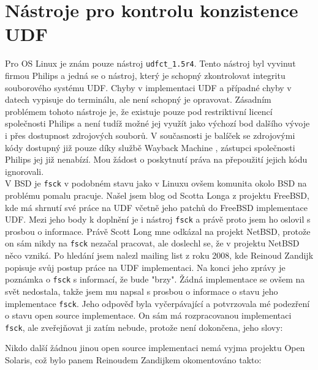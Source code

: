 \chapter{Nástroje pro kontrolu konzistence UDF}
\label{sec:nastroje}
Pro OS Linux je znám pouze nástroj \texttt{udfct\_1.5r4}. Tento nástroj byl vyvinut firmou Philips a jedná se o nástroj, který je schopný zkontrolovat integritu souborového systému UDF. Chyby v implementaci UDF a případné chyby v datech vypisuje do terminálu, ale není schopný je opravovat. Zásadním problémem tohoto nástroje je, že existuje pouze pod restriktivní licencí společnosti Philips a není tudíž možné jej využít jako výchozí bod dalšího vývoje i přes dostupnost zdrojových souborů. V současnosti je balíček se zdrojovými kódy dostupný již pouze díky službě Wayback Machine \cite{wayback}, zástupci společnosti Philips jej již nenabízí. Mou žádost o poskytnutí práva na přepoužití jejich kódu ignorovali.\\
V BSD je \texttt{fsck} v podobném stavu jako v Linuxu ovšem komunita okolo BSD na problému pomalu pracuje. Našel jsem blog \cite{scottuvblog} od Scotta Longa z projektu FreeBSD, kde má shrnutí své práce na UDF včetně jeho patchů do FreeBSD implementace UDF. Mezi jeho body k doplnění je i nástroj \texttt{fsck} a právě proto jsem ho oslovil s prosbou o informace. Právě Scott Long mne odkázal na projekt NetBSD, protože on sám nikdy na \texttt{fsck} nezačal pracovat, ale doslechl se, že v projektu NetBSD něco vzniká. Po hledání jsem nalezl mailing list z roku 2008, kde Reinoud Zandijk popisuje svůj postup práce na UDF implementaci. Na konci jeho zprávy je poznámka o \texttt{fsck} s informací, že bude "brzy". Žádná implementace se ovšem na svět nedostala, takže jsem mu napsal s prosbou o informace o  stavu jeho implementace \texttt{fsck}. Jeho odpověď byla vyčerpávající a potvrzovala mé podezření o stavu open source implementace. On sám má rozpracovanou implementaci \texttt{fsck}, ale zveřejňovat ji zatím nebude, protože není dokončena, jeho slovy: 
\begin{quote} 
\end{quote} 
Nikdo další žádnou jinou open source implementaci nemá vyjma projektu Open Solaris, což bylo panem Reinoudem Zandijkem okomentováno takto:
\begin{quote}
\end{quote}
